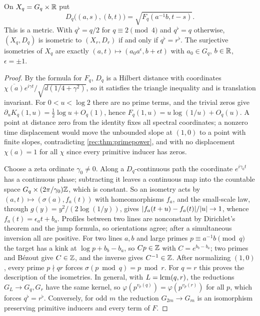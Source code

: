 \begin{theorem}\label{rec:thm:rigid}
On $X_q=G_q\times\mathbb{R}$ put
\[
 D_q\bigl((a,s),(b,t)\bigr)=\sqrt{F_q(a^{-1}b,t-s)} .
\]
This is a metric. With
$q^\flat=q/2$ for $q\equiv2\pmod4$ and $q^\flat=q$ otherwise, $(X_q,D_q)$ is isometric to $(X_r,D_r)$
if and only if $q^\flat=r^\flat$. The surjective isometries of $X_q$ are exactly
$(a,t)\mapsto(a_0a^\epsilon,b+\epsilon t)$ with $a_0\in G_q$, $b\in\mathbb{R}$, $\epsilon=\pm1$.
\end{theorem}

\begin{proof}
By the formula for $F_q$, $D_q$ is a Hilbert distance with coordinates
$\overline{\chi(a)}e^{i\gamma t}/\sqrt{d(1/4+\gamma^2)}$, so it satisfies the triangle inequality and is
translation invariant. For $0<u<\log2$ there are no prime terms, and the trivial zeros give
$\partial_uK_q(1,u)=\tfrac12\log u+O_q(1)$, hence $F_q(1,u)=u\log(1/u)+O_q(u)$. A point at distance
zero from the identity fixes all spectral coordinates; a nonzero time displacement would move the
unbounded slope at $(1,0)$ to a point with finite slopes, contradicting \cref{rec:thm:primepower},
and with no displacement $\chi(a)=1$ for all $\chi$ since every primitive inducer has zeros.

Choose a zeta ordinate $\gamma_0\ne0$. Along a $D_q$-continuous path the coordinate $e^{i\gamma_0t}$ has
a continuous phase; subtracting it leaves a continuous map into the countable space
$G_q\times(2\pi/\gamma_0)\mathbb{Z}$, which is constant. So an isometry acts by
$(a,t)\mapsto(\sigma(a),f_a(t))$ with homeomorphisms $f_a$, and the small-scale law, through
$g(y)=y^2/(2\log(1/y))$, gives $\lvert f_a(t+u)-f_a(t)\rvert/\lvert u\rvert\to1$, whence $f_a(t)=\epsilon_at+b_a$.
Profiles between two lines are nonconstant by Dirichlet's theorem and the jump formula, so
orientations agree; after a simultaneous inversion all are positive. For two lines $a,b$ and large
primes $p\equiv a^{-1}b\pmod q$ the target has a kink at $\log p+b_b-b_a$, so $Cp\in\mathbb{Z}$ with
$C=e^{b_b-b_a}$; two primes and B\'ezout give $C\in\mathbb{Z}$, and the inverse gives $C^{-1}\in\mathbb{Z}$. After
normalizing $(1,0)$, every prime $p\nmid qr$ forces $\sigma(p\bmod q)=p\bmod r$. For $q=r$ this proves the
description of the isometries. In general, with $L=\operatorname{lcm}(q,r)$, the reductions $G_L\to G_q,G_r$ have
the same kernel, so $\varphi(p^{v_p(q)})=\varphi(p^{v_p(r)})$ for all $p$, which forces $q^\flat=r^\flat$.
Conversely, for odd $m$ the reduction $G_{2m}\to G_m$ is an isomorphism preserving primitive inducers
and every term of $F$.
\end{proof}

